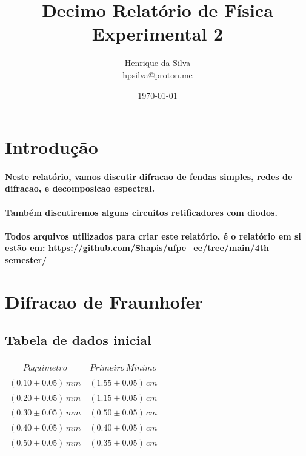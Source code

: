 \documentclass[12pt,twoside, a4paper, twocolumn]{article}
\title{Decimo  Relatório de Física Experimental 2}
\author{Henrique da Silva \\ hpsilva@proton.me}
\date{\today}
\begin{document}
\maketitle
{}
\newpage
\tableofcontents
\newpage

\section{Introdução}

\paragraph*{Neste relatório, vamos discutir difracao de fendas simples, redes de difracao, e decomposicao espectral.}

\paragraph*{Também discutiremos alguns circuitos retificadores com diodos.}

\paragraph*{Todos arquivos utilizados para criar este relatório, é o relatório em si estão em:  \url{https://github.com/Shapis/ufpe_ee/tree/main/4th semester/}}


\section{Difracao de Fraunhofer}


\subsection{Tabela de dados inicial}

\begin{center}
  \begin{tabular}{ |c|c|c| }
    \hline
    $Paquimetro$          & $Primeiro\,Minimo$    \\
    $(0.10 \pm 0.05)\,mm$ & $(1.55 \pm 0.05)\,cm$ \\
    $(0.20 \pm 0.05)\,mm$ & $(1.15 \pm 0.05)\,cm$ \\
    $(0.30 \pm 0.05)\,mm$ & $(0.50 \pm 0.05)\,cm$ \\
    $(0.40 \pm 0.05)\,mm$ & $(0.40 \pm 0.05)\,cm$ \\
    $(0.50 \pm 0.05)\,mm$ & $(0.35 \pm 0.05)\,cm$ \\
    \hline
  \end{tabular}
\end{center}
\end{document}
